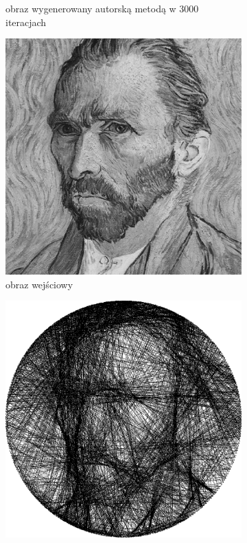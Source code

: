 \begin{figure}[H]
\begin{subfigure}{0.24\textwidth}
        \caption{obraz wygenerowany autorską metodą w 3000 iteracjach}
        \label{comp-comp-dufu-gogh-d}
    \end{subfigure}
    \begin{subfigure}{0.24\textwidth}
        \centering
        \includegraphics[width = \textwidth]{img/6-comp/gogh_original_c10_inv0.png}
        \caption{obraz wejściowy}
        \label{comp-comp-dufu-gogh-e}
    \end{subfigure}
    \begin{subfigure}{0.24\textwidth}
        \centering
        \includegraphics[width = \textwidth]{img/6-comp/gogh_xiaonan_.png}

\end{subfigure}
\end{figure}
